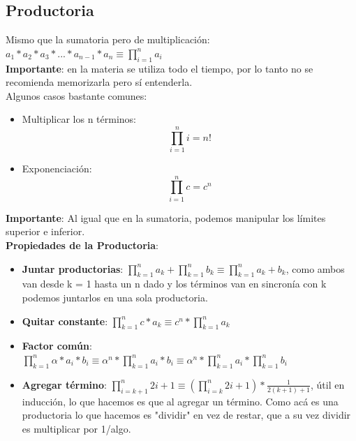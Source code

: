 \documentclass[10pt,a4paper]{article}
\begin{document}
\subsection*{Productoria}
Mismo que la sumatoria pero de multiplicación: $ a_{1} \ast a_{2} \ast a_{3} \ast ... \ast a_{n-1} \ast a_{n} \equiv \prod_{i=1}^{n}{a_{i}}$ \\
\textbf{Importante}: en la materia se utiliza todo el tiempo, por lo tanto no se recomienda memorizarla pero sí entenderla. \\
Algunos casos bastante comunes:
\begin{itemize}
    \item Multiplicar los n términos: \[\prod_{i=1}^{n}{i} = n!\]
    \item Exponenciación: \[\prod_{i=1}^{n}{c} = c^{n}\]
\end{itemize}
\textbf{Importante}: Al igual que en la sumatoria, podemos manipular los límites superior e inferior. \\
\textbf{Propiedades de la Productoria}: 
\begin{itemize}
    \item \textbf{Juntar productorias}: $\prod_{k=1}^{n}{a_{k}} + \prod_{k=1}^{n}{b_{k}}  \equiv \prod_{k=1}^{n}{a_{k} + b_{k}} $, como ambos van desde k = 1 hasta un n dado y los términos van en sincronía con k podemos juntarlos en una sola productoria.
    \item \textbf{Quitar constante}: $\prod_{k=1}^{n}{c \ast a_{k}} \equiv c^{n} \ast \prod_{k=1}^{n}{a_{k}}$
    \item \textbf{Factor común}: $\prod_{k=1}^{n}{\alpha \ast a_{i} \ast b_{i}} \equiv  \alpha^{n} \ast \prod_{k=1}^{n}{a_{i} \ast b_{i}} \equiv \alpha^{n} \ast \prod_{k=1}^{n}{a_{i}} \ast \prod_{k=1}^{n}{b_{i}} $
    \item \textbf{Agregar término}: $\prod_{i=k+1}^{n}{2i+1} \equiv (\prod_{i=k}^{n}{2i+1}) \ast \frac{1}{2(k+1)+1}$, útil en inducción, lo que hacemos es que al agregar un término. Como acá es una productoria lo que hacemos es "dividir" en vez de restar, que a su vez dividir es multiplicar por 1/algo.
\end{itemize}
\end{document}
